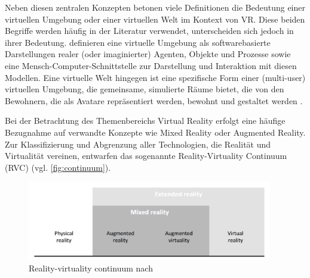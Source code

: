 Neben diesen zentralen Konzepten betonen viele Definitionen die Bedeutung einer virtuellen Umgebung oder einer virtuellen Welt im Kontext von VR. Diese beiden Begriffe werden häufig in der Literatur verwendet, unterscheiden sich jedoch in ihrer Bedeutung. \citet{barfield_presence_1995} definieren eine virtuelle Umgebung als softwarebasierte Darstellungen realer (oder imaginierter) Agenten, Objekte und Prozesse sowie eine Mensch-Computer-Schnittstelle zur Darstellung und Interaktion mit diesen Modellen. Eine virtuelle Welt hingegen ist eine spezifische Form einer (multi-user) virtuellen Umgebung, die gemeinsame, simulierte Räume bietet, die von den Bewohnern, die als Avatare repräsentiert werden, bewohnt und gestaltet werden \citep{girvan_what_2018}.

Bei der Betrachtung des Themenbereichs Virtual Reality erfolgt eine häufige Bezugnahme auf verwandte Konzepte wie Mixed Reality oder Augmented Reality. Zur Klassifizierung und Abgrenzung aller Technologien, die Realität und Virtualität vereinen, entwarfen \citet{milgram_augmented_1995} das sogenannte Reality-Virtuality Continuum (RVC) (vgl. \autoref{fig:continuum}). 

\begin{figure}[tbh]
    \centering
    \includegraphics[width=0.95\textwidth]{images/Mixed-Reality-Cont-NEW.png}
    \caption{Reality-virtuality continuum nach \cite{wohlgenannt_virtual_2020}}
    \label{fig:continuum}
\end{figure}

